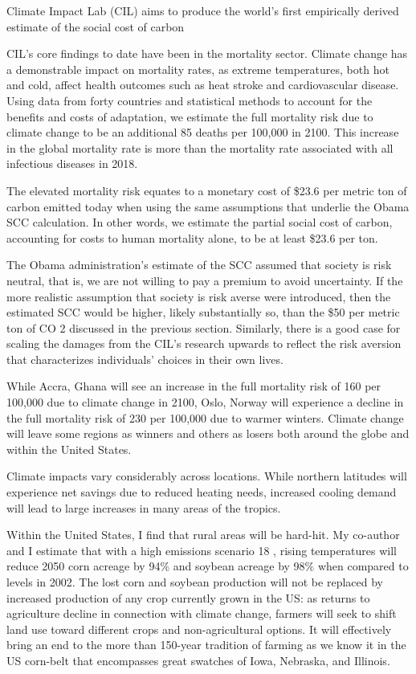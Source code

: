 \documentclass[
]{book}
\begin{document}
Climate Impact Lab (CIL) aims to produce the
world's first empirically derived estimate of the social cost of carbon

CIL's core findings to date have been in the mortality sector. Climate change has a demonstrable
impact on mortality rates, as extreme temperatures, both hot and cold, affect health outcomes
such as heat stroke and cardiovascular disease. Using data from forty countries and statistical
methods to account for the benefits and costs of adaptation, we estimate the full mortality risk
due to climate change to be an additional 85 deaths per 100,000 in 2100.
This increase in the global mortality rate is more than the mortality rate associated with
all infectious diseases in 2018.

The elevated mortality risk equates to a monetary cost of \$23.6
per metric ton of carbon emitted today when using the same assumptions that underlie the
Obama SCC calculation. In other words, we estimate the partial social cost of carbon,
accounting for costs to human mortality alone, to be at least \$23.6 per ton.

The Obama administration's estimate of the SCC assumed that society is
risk neutral, that is, we are not willing to pay a premium to avoid uncertainty. If the more
realistic assumption that society is risk averse were introduced, then the estimated SCC would be
higher, likely substantially so, than the \$50 per metric ton of CO 2 discussed in the previous
section. Similarly, there is a good case for scaling the damages from the CIL's research upwards
to reflect the risk aversion that characterizes individuals' choices in their own lives.

While Accra, Ghana will see an increase in the full mortality
risk of 160 per 100,000 due to climate change in 2100, Oslo, Norway will experience a decline in
the full mortality risk of 230 per 100,000 due to warmer winters.
Climate change
will leave some regions as winners and others as losers both around the globe and within the
United States.

Climate impacts vary considerably
across locations. While northern latitudes will experience net savings due to reduced heating
needs, increased cooling demand will lead to large increases in many areas of the tropics.

Within the United States, I find that rural
areas will be hard-hit. My co-author and I estimate that with a high emissions scenario 18 , rising
temperatures will reduce 2050 corn acreage by 94\% and soybean acreage by 98\% when
compared to levels in 2002. The lost corn and soybean production will not be replaced by
increased production of any crop currently grown in the US: as returns to agriculture decline in
connection with climate change, farmers will seek to shift land use toward different crops and
non-agricultural options. It will effectively bring an end to the more than 150-year tradition of
farming as we know it in the US corn-belt that encompasses great swatches of Iowa, Nebraska,
and Illinois.
\end{document}
